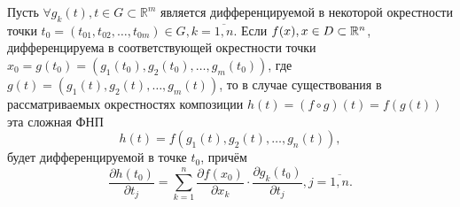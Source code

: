 \begin{theorem}
	Пусть $\forall g_k(t), t \in G \subset \mathbb{R}^m$ является дифференцируемой в некоторой окрестности точки $t_0 = (t_{01}, t_{02}, \ldots, t_{0m}) \in G, k = \overline{1,n}$. Если $f(x), x \in D \subset \mathbb{R}^n$, дифференцируема в соответствующей окрестности точки $x_0 = g(t_0) = \left(g_1(t_0), g_2(t_0), \ldots, g_m(t_0) \right)$, где $g(t	) = \left(g_1(t), g_2(t), \ldots, g_m(t) \right)$, то в случае существования в рассматриваемых окрестностях композиции $h(t) = (f \circ g)(t) = f(g(t))$ эта сложная ФНП 
	\begin{equation}
	\label{313}
	h(t) = f\left(g_1(t), g_2(t), \ldots, g_n(t)\right),
	\end{equation}
	будет дифференцируемой в точке $t_0$, причём
	\begin{equation}
	\label{314}
	\dfrac{\partial h(t_0)}{\partial t_j} = \sum_{k=1}^{n} \dfrac{\partial f(x_0)}{\partial x_k} \cdot \dfrac{\partial g_k(t_0)}{\partial t_j}, j = \overline{1,n}.
	\end{equation}
\end{theorem}
